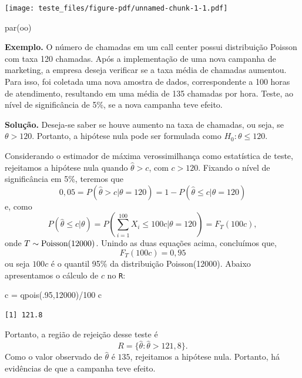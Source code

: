 \documentclass[
  letterpaper,
  DIV=11,
  numbers=noendperiod]{scrartcl}
\newenvironment{Shaded}{\begin{snugshade}}{\end{snugshade}}
\newcommand{\DecValTok}[1]{\textcolor[rgb]{0.68,0.00,0.00}{#1}}
\newcommand{\FunctionTok}[1]{\textcolor[rgb]{0.28,0.35,0.67}{#1}}
\newcommand{\NormalTok}[1]{\textcolor[rgb]{0.00,0.23,0.31}{#1}}
\newcommand{\OtherTok}[1]{\textcolor[rgb]{0.00,0.23,0.31}{#1}}
\newcommand{\SpecialCharTok}[1]{\textcolor[rgb]{0.37,0.37,0.37}{#1}}
\begin{document}
\texttt{[image: teste\_files/figure-pdf/unnamed-chunk-1-1.pdf]}

\begin{Shaded}
\begin{Highlighting}[]
\FunctionTok{par}\NormalTok{(oo)}
\end{Highlighting}
\end{Shaded}

\textbf{Exemplo.} O número de chamadas em um call center possui
distribuição Poisson com taxa 120 chamadas. Após a implementação de uma
nova campanha de marketing, a empresa deseja verificar se a taxa média
de chamadas aumentou. Para isso, foi coletada uma nova amostra de dados,
correspondente a 100 horas de atendimento, resultando em uma média de
135 chamadas por hora. Teste, ao nível de significância de 5\%, se a
nova campanha teve efeito.

\textbf{Solução.} Deseja-se saber se houve aumento na taxa de chamadas,
ou seja, se \(\theta>120\). Portanto, a hipótese nula pode ser formulada
como \(H_0:\theta\leq 120\).

Considerando o estimador de máxima verossimilhança como estatística de
teste, rejeitamos a hipótese nula quando \(\hat{\theta}>c\), com
\(c>120\). Fixando o nível de significância em 5\%, teremos que
\[0,05=P(\hat{\theta}>c|\theta=120)=1-P(\hat{\theta}\leq c|\theta=120)\]
e, como
\[P(\hat{\theta}\leq c|\theta)=P\left(\sum_{i=1}^{100}X_i\leq 100c|\theta=120\right)=F_T(100c),\]
onde \(T\sim\hbox{Poisson}(12000)\). Unindo as duas equações acima,
concluímos que, \[F_T(100c)=0,95\] ou seja \(100c\) é o quantil 95\% da
distribuição Poisson(12000). Abaixo apresentamos o cálculo de \(c\) no
\texttt{R}:

\begin{Shaded}
\begin{Highlighting}[]
\NormalTok{c }\OtherTok{=} \FunctionTok{qpois}\NormalTok{(.}\DecValTok{95}\NormalTok{,}\DecValTok{12000}\NormalTok{)}\SpecialCharTok{/}\DecValTok{100}
\NormalTok{c}
\end{Highlighting}
\end{Shaded}

\begin{verbatim}
[1] 121.8
\end{verbatim}

Portanto, a região de rejeição desse teste é
\[R=\{\hat{\theta}:\hat{\theta}>121,8\}.\] Como o valor observado de
\(\hat{\theta}\) é \(135\), rejeitamos a hipótese nula. Portanto, há
evidências de que a campanha teve efeito.
\end{document}
